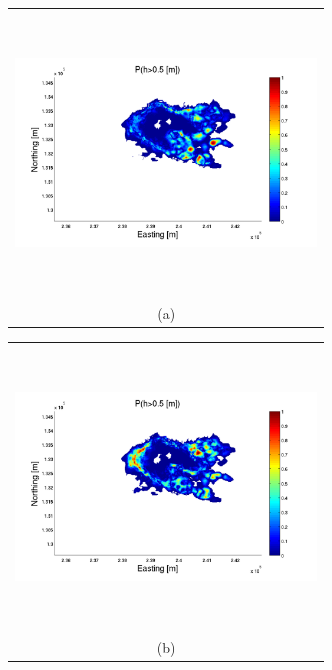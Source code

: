 \documentclass[12pt]{article}
\newcommand{\Pic}[2][0.85]{\begin{center}\texttt{[image: \#2]}
 \end{center} }
\begin{document}
\begin{figure}[H]
      \begin{minipage}[b]{0.6\textwidth}
        \begin{tabular}{c}
       \includegraphics[width=8cm,height=7.5cm,keepaspectratio]{figs_pdf/Galeras0_minus_Aster30.pdf}\\
        (a)
        \end{tabular}
    \end{minipage}
    \begin{minipage}{0.6\textwidth}
        \begin{tabular}{c}
	\includegraphics[width=8cm,height=7.5cm,keepaspectratio]{figs_pdf/Galeras3_minus_Aster30.pdf}\\
        (b)
        \end{tabular}
    \end{minipage} 
    \begin{minipage}[b]{0.6\textwidth}
        \begin{tabular}{c}

\end{tabular}
\end{minipage}
\end{figure}
\end{document}
